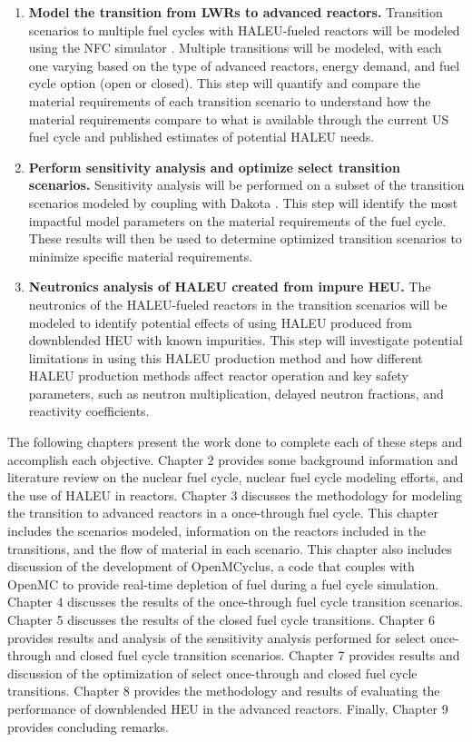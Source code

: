 \begin{enumerate}
\item \textbf{Model the transition from \glspl{LWR} to advanced reactors.} 
Transition scenarios to multiple fuel cycles with \gls{HALEU}-fueled 
reactors will 
be modeled using the \gls{NFC} simulator \Cyclus \cite{huff_fundamental_2016}. 
Multiple transitions will be modeled, with each one varying based on the type
of  
advanced reactors, energy demand, and fuel cycle option (open or closed). This 
step will quantify and compare the material requirements of each transition 
scenario to understand how the material requirements compare to what is available 
through the current US fuel cycle and published estimates of potential 
\gls{HALEU} needs. 

\item \textbf{Perform sensitivity analysis and optimize select transition scenarios.}
Sensitivity analysis will be performed on a subset of the transition scenarios
modeled by coupling \Cyclus with Dakota \cite{adams_dakota_2019}. This step 
will identify the most impactful model parameters on 
the material requirements of the fuel cycle. These results will then be 
used to determine optimized transition scenarios to minimize specific 
material requirements. 

\item \textbf{Neutronics analysis of \gls{HALEU} created from impure \gls{HEU}.}
The neutronics of the \gls{HALEU}-fueled reactors in the transition scenarios 
will be modeled to identify potential effects of using \gls{HALEU} produced 
from downblended \gls{HEU} with known impurities. This step will investigate 
potential limitations in using this \gls{HALEU} production method and 
how different \gls{HALEU} production methods affect reactor operation and 
key safety parameters, such as neutron multiplication, delayed neutron 
fractions, and reactivity coefficients.
\end{enumerate}


The following chapters present the work done to complete each of 
these steps and accomplish each objective. Chapter 2 
provides some 
background information and literature review on the nuclear fuel cycle,
nuclear fuel cycle 
modeling efforts, and the use of \gls{HALEU} in reactors.
Chapter 3 discusses the methodology for modeling the transition to advanced 
reactors in a once-through fuel cycle. This chapter includes the scenarios
modeled, information on the reactors included in the transitions, and the 
flow of 
material in each scenario. This chapter also includes discussion of the 
development of OpenMCyclus, a code that couples \Cyclus with OpenMC 
to provide real-time depletion of fuel during a fuel cycle simulation. 
Chapter 4 discusses the results of the 
once-through fuel cycle transition scenarios. Chapter 5 discusses the 
results of the closed fuel cycle transitions. Chapter 6 provides results 
and analysis of the sensitivity analysis performed for select once-through 
and closed fuel cycle transition scenarios. Chapter 7 provides 
results and discussion of the optimization of select once-through and 
closed fuel cycle transitions. Chapter 8 provides the methodology and 
results of evaluating the performance of downblended \gls{HEU} in 
the advanced reactors. Finally, Chapter 9 provides concluding remarks. 